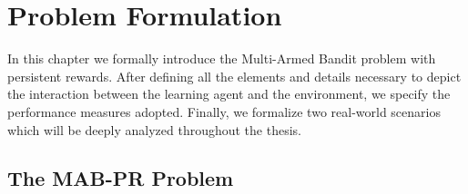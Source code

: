 \chapter{Problem Formulation}\label{CF}



In this chapter we formally introduce the Multi-Armed Bandit problem with persistent rewards. After defining all the elements and details necessary to depict the interaction between the learning agent and the environment, we specify the performance measures adopted. Finally, we formalize two real-world scenarios which will be deeply analyzed throughout the thesis.


\section{The MAB-PR Problem}

